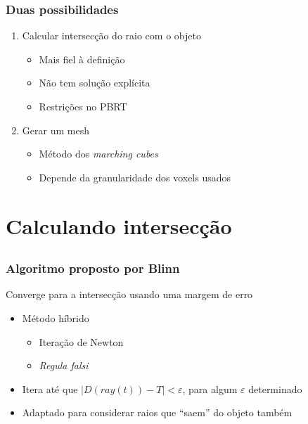 \documentclass[brazil]{beamer}
\begin{document}
      \begin{frame}
        \frametitle{Duas possibilidades}
        \begin{enumerate}
          \item
            Calcular intersecção do raio com o objeto
            \begin{itemize}
              \item Mais fiel à definição
              \item Não tem solução explícita
              \item Restrições no PBRT
            \end{itemize}
          \vspace{1em}
          \pause
          \item Gerar um mesh
            \begin{itemize}
              \item Método dos \textit{marching cubes}
              \item Depende da granularidade dos voxels usados
            \end{itemize}
        \end{enumerate}
      \end{frame}
      
  \section{Calculando intersecção}
  
    \subsection{}
    
      \begin{frame}
        \frametitle{Algoritmo proposto por Blinn}
          Converge para a intersecção usando uma margem de erro
          \begin{itemize}
            \vspace{1em}
            \pause
            \item
              Método híbrido
              \begin{itemize}
                \item Iteração de Newton
                \item \textit{Regula falsi}
              \end{itemize}
            \vspace{1em}
            \pause
            \item
              Itera até que $| D(ray(t)) - T | < \varepsilon $, para algum $\varepsilon$ determinado
            \vspace{1em}
            \pause
            \item Adaptado para considerar raios que ``saem'' do objeto também
          \end{itemize}
      \end{frame}
      
\end{document}
